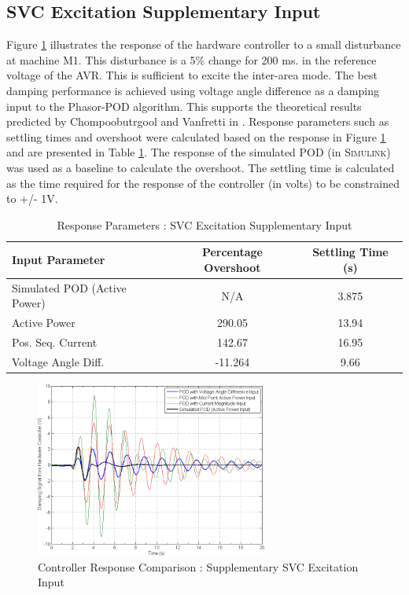 \documentclass[journal]{IEEEtran}
\begin{document}
\subsection{SVC Excitation Supplementary Input}
Figure \ref{SVC_Plots} illustrates the response of the hardware controller to a small disturbance at machine M1. This disturbance is a 5\% change for 200 ms. in the reference voltage of the AVR. This is sufficient to excite the inter-area mode. The best damping performance is achieved using voltage angle difference as a damping input to the Phasor-POD algorithm. This supports the theoretical results predicted by Chompoobutrgool and Vanfretti in \cite{Yuwa}. Response parameters such as settling times and overshoot were calculated based on the response in Figure \ref{SVC_Plots} and are presented in Table \ref{SVCResponseTable}. The response of the simulated POD (in \textsc{Simulink}) was used as a baseline to calculate the overshoot. The settling time is calculated as the time required for the response of the controller (in volts) to be constrained to +/- 1V.
\begin{table}[!ht]
\caption{Response Parameters : SVC Excitation Supplementary Input}\label{SVCResponseTable}
\begin{center}
\begin{tabular}{|l|c|c|}
\hline \textbf{Input Parameter} & \textbf{Percentage Overshoot} & \textbf{Settling Time (s)} \\
\hline Simulated POD (Active Power)& N/A & 3.875 \\ 
\hline Active Power & 290.05 & 13.94 \\ 
\hline Pos. Seq. Current & 142.67 & 16.95\\ 
\hline Voltage Angle Diff. & -11.264 & 9.66\\ 
\hline 
\end{tabular}
\end{center}
\end{table}  


\begin{figure}[!th]
\centering
\includegraphics[width=3in]{SVC_ResponseComparison_Labelled_NoVMag.png}
\caption{Controller Response Comparison : Supplementary SVC Excitation Input}
\label{SVC_Plots}
\end{figure}
\end{document}
